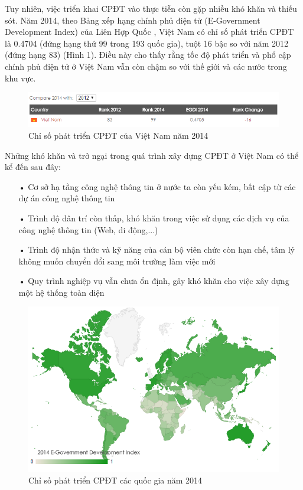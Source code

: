 \documentclass[a4paper]{article}
\begin{document}
Tuy nhiên, việc triển khai CPĐT vào thực tiễn còn gặp nhiều khó khăn và thiếu sót. Năm 2014, theo Bảng xếp hạng chính phủ điện tử (E-Government Development Index) của Liên Hợp Quốc \cite{bib3}, Việt Nam có chỉ số phát triển CPĐT là 0.4704 (đứng hạng thứ 99 trong 193 quốc gia), tuột 16 bậc so với năm 2012 (đứng hạng 83) (Hình 1). Điều này cho thấy rằng tốc độ phát triển và phổ cập chính phủ điện tử ở Việt Nam vẫn còn chậm so với thế giới và các nước trong khu vực.
\begin{center}
    \begin{figure}[htp]
    \begin{center}
     \includegraphics[scale=.85]{2014-vietnam-edgi.PNG}
    \end{center}
    \caption{Chỉ số phát triển CPĐT của Việt Nam năm 2014}
    \label{refhinh1}
    \end{figure}
\end{center}
Những khó khăn và trở ngại trong quá trình xây dựng CPĐT ở Việt Nam có thể kể đến sau đây:
\begin{itemize}
	\item[•]Cơ sở hạ tầng công nghệ thông tin ở nước ta còn yếu kém, bất cập từ các dự án công nghệ thông tin
	\item[•]Trình độ dân trí còn thấp, khó khăn trong việc sử dụng các dịch vụ của công nghệ thông tin (Web, di động,...)
	\item[•]Trình độ nhận thức và kỹ năng của cán bộ viên chức còn hạn chế, tâm lý không muốn chuyển đổi sang môi trường làm việc mới
	\item[•]Quy trình nghiệp vụ vẫn chưa ổn định, gây khó khăn cho việc xây dựng một hệ thống toàn diện
\end{itemize}
\begin{center}
    \begin{figure}[htp]
    \begin{center}
     \includegraphics[scale=.8]{2014-edgi.PNG}
    \end{center}
    \caption{Chỉ số phát triển CPĐT các quốc gia năm 2014}
    \label{refhinh2}
    \end{figure}
\end{center}
\end{document}
